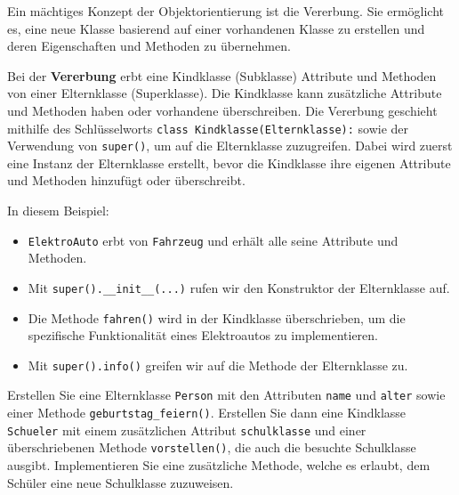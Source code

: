 Ein mächtiges Konzept der Objektorientierung ist die Vererbung. Sie ermöglicht es, eine neue Klasse basierend auf einer vorhandenen Klasse zu erstellen und deren Eigenschaften und Methoden zu übernehmen.

\begin{mydefinition}
Bei der \textbf{Vererbung} erbt eine Kindklasse (Subklasse) Attribute und Methoden von einer Elternklasse (Superklasse). Die Kindklasse kann zusätzliche Attribute und Methoden haben oder vorhandene überschreiben. Die Vererbung geschieht mithilfe des Schlüsselworts \lstinline|class Kindklasse(Elternklasse):| sowie der Verwendung von \lstinline|super()|, um auf die Elternklasse zuzugreifen. Dabei wird zuerst eine Instanz der Elternklasse erstellt, bevor die Kindklasse ihre eigenen Attribute und Methoden hinzufügt oder überschreibt.
\end{mydefinition}

\begin{myexample}[Vererbung]

\end{myexample}

In diesem Beispiel:
\begin{itemize}
	\item \lstinline|ElektroAuto| erbt von \lstinline|Fahrzeug| und erhält alle seine Attribute und Methoden.
	\item Mit \lstinline|super().__init__(...)| rufen wir den Konstruktor der Elternklasse auf.
	\item Die Methode \lstinline|fahren()| wird in der Kindklasse überschrieben, um die spezifische Funktionalität eines Elektroautos zu implementieren.
	\item Mit \lstinline|super().info()| greifen wir auf die Methode der Elternklasse zu.
\end{itemize}

\begin{myexercise}
	Erstellen Sie eine Elternklasse \lstinline|Person| mit den Attributen \lstinline|name| und \lstinline|alter| sowie einer Methode \lstinline|geburtstag_feiern()|. Erstellen Sie dann eine Kindklasse \lstinline|Schueler| mit einem zusätzlichen Attribut \lstinline|schulklasse| und einer überschriebenen Methode \lstinline|vorstellen()|, die auch die besuchte Schulklasse ausgibt. Implementieren Sie eine zusätzliche Methode, welche es erlaubt, dem Schüler eine neue Schulklasse zuzuweisen.
	\begin{myanswer}
		\leavevmode
		
	\end{myanswer}
\end{myexercise}

